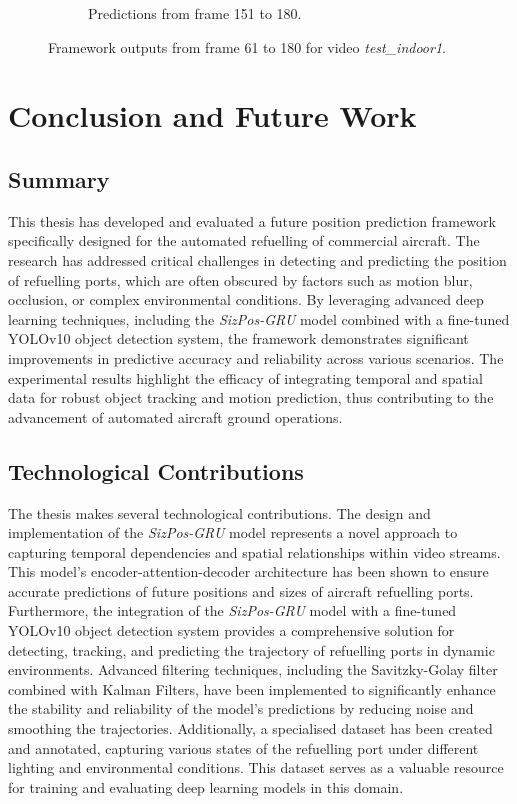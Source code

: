 \documentclass[12pt,oneside]{book} %
\begin{document}
\begin{figure}[H]
\begin{subfigure}[t]{0.8\textwidth}
        \caption{Predictions from frame 151 to 180.}
        \label{fig:framework-test_indoor1-3}
    \end{subfigure}
    \caption{Framework outputs from frame 61 to 180 for video \textit{test\_indoor1}.}
    \label{fig:framework-test_indoor1}
\end{figure}

\chapter{Conclusion and Future Work}\label{chap:conclusion}

\section{Summary}
This thesis has developed and evaluated a future position prediction framework
specifically designed for the automated refuelling of commercial aircraft. The
research has addressed critical challenges in detecting and predicting the
position of refuelling ports, which are often obscured by factors such as
motion blur, occlusion, or complex environmental conditions. By leveraging
advanced deep learning techniques, including the \textit{SizPos-GRU} model combined with
a fine-tuned YOLOv10 object detection system, the framework demonstrates
significant improvements in predictive accuracy and reliability across various
scenarios. The experimental results highlight the efficacy of integrating
temporal and spatial data for robust object tracking and motion prediction,
thus contributing to the advancement of automated aircraft ground operations.

\section{Technological Contributions}
The thesis makes several technological contributions. The design and
implementation of the \textit{SizPos-GRU} model represents a novel approach to capturing
temporal dependencies and spatial relationships within video streams. This
model's encoder-attention-decoder architecture has been shown to ensure
accurate predictions of future positions and sizes of aircraft refuelling
ports. Furthermore, the integration of the \textit{SizPos-GRU} model with a fine-tuned
YOLOv10 object detection system provides a comprehensive solution for
detecting, tracking, and predicting the trajectory of refuelling ports in
dynamic environments. Advanced filtering techniques, including the
Savitzky-Golay filter combined with Kalman Filters, have been implemented to
significantly enhance the stability and reliability of the model's predictions
by reducing noise and smoothing the trajectories. Additionally, a specialised
dataset has been created and annotated, capturing various states of the
refuelling port under different lighting and environmental conditions. This
dataset serves as a valuable resource for training and evaluating deep learning
models in this domain.
\end{document}
